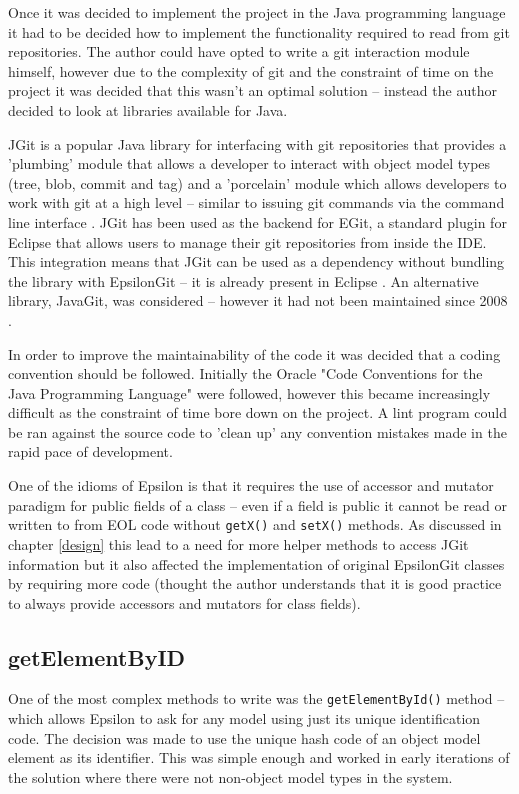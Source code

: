\documentclass[11pt]{book}
\newcommand{\code}[1]{\texttt{#1}}
\begin{document}
Once it was decided to implement the project in the Java programming language it had to be decided how to implement the functionality required to read from git repositories. The author could have opted to write a git interaction module himself, however due to the complexity of git and the constraint of time on the project it was decided that this wasn't an optimal solution -- instead the author decided to look at libraries available for Java. 

JGit is a popular Java library for interfacing with git repositories that provides a 'plumbing' module that allows a developer to interact with object model types (tree, blob, commit and tag) and a 'porcelain' module which allows developers to work with git at a high level -- similar to issuing git commands via the command line interface \cite{jgit}. JGit has been used as the backend for EGit, a standard plugin for Eclipse that allows users to manage their git repositories from inside the IDE. This integration means that JGit can be used as a dependency without bundling the library with EpsilonGit -- it is already present in Eclipse \cite{egit}. An alternative library, JavaGit, was considered -- however it had not been maintained since 2008 \cite{javagit}.

In order to improve the maintainability of the code it was decided that a coding convention should be followed. Initially the Oracle "Code Conventions for the Java Programming Language" were followed, however this became increasingly difficult as the constraint of time bore down on the project. A lint program could be ran against the source code to 'clean up' any convention mistakes made in the rapid pace of development.

One of the idioms of Epsilon is that it requires the use of accessor and mutator paradigm for public fields of a class -- even if a field is public it cannot be read or written to from EOL code without \code{getX()} and \code{setX()} methods. As discussed in chapter \ref{design} this lead to a need for more helper methods to access JGit information but it also affected the implementation of original EpsilonGit classes by requiring more code (thought the author understands that it is good practice to always provide accessors and mutators for class fields). 

\subsection{getElementByID}
One of the most complex methods to write was the \code{getElementById()} method -- which allows Epsilon to ask for any model using just its unique identification code. The decision was made to use the unique hash code of an object model element as its identifier. This was simple enough and worked in early iterations of the solution where there were not non-object model types in the system.
\end{document}
